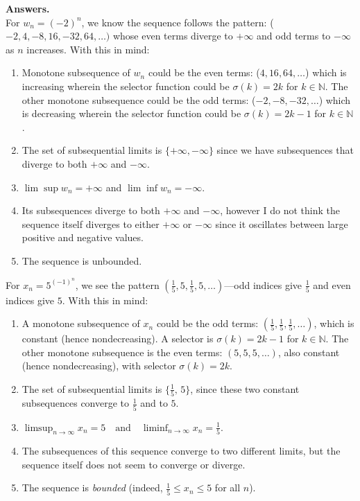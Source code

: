 \documentclass[12pt]{article}
\begin{document}
\textbf{Answers.}\\
For \textbf{$w_n = (-2)^n$}, we know the sequence follows the pattern: ($-2, 4, -8, 16, -32, 64, \dots )$ whose even terms diverge to $+\infty$ and odd terms to $-\infty$ as $n$ increases. With this in mind:
\begin{enumerate}[label=(\alph*)]
    \item Monotone subsequence of $w_n$ could be the even terms: ($4, 16, 64, \dots$) which is increasing wherein the selector function could be $\sigma(k) = 2k$ for $k \in \mathbb{N}$. The other monotone subsequence could be the odd terms: ($-2, -8, -32, \dots$) which is decreasing wherein the selector function could be $\sigma(k) = 2k - 1$ for $k \in \mathbb{N}$.
    \item The set of subsequential limits is $\{ +\infty, -\infty \}$ since we have subsequences that diverge to both $+\infty$ and $-\infty$.
    \item $\lim \sup w_n = +\infty$ and $\lim \inf w_n = -\infty$.
    \item Its subsequences diverge to both $+\infty$ and $-\infty$, however I do not think the sequence itself diverges to either $+\infty$ or $-\infty$ since it oscillates between large positive and negative values.
    \item The sequence is unbounded.
\end{enumerate}

For \textbf{$x_n = 5^{(-1)^n}$}, we see the pattern $(\tfrac{1}{5}, 5, \tfrac{1}{5}, 5, \dots)$—odd indices give $\tfrac{1}{5}$ and even indices give $5$. With this in mind:
\begin{enumerate}[label=(\alph*)]
    \item A monotone subsequence of $x_n$ could be the odd terms: $(\tfrac{1}{5}, \tfrac{1}{5}, \tfrac{1}{5}, \dots)$, which is constant (hence nondecreasing). A selector is $\sigma(k)=2k-1$ for $k\in\mathbb{N}$.  
    The other monotone subsequence is the even terms: $(5, 5, 5, \dots)$, also constant (hence nondecreasing), with selector $\sigma(k)=2k$.
    \item The set of subsequential limits is $\bigl\{\tfrac{1}{5},\,5\bigr\}$, since these two constant subsequences converge to $\tfrac{1}{5}$ and to $5$.
    \item $\limsup_{n\to\infty} x_n = 5 \quad\text{and}\quad \liminf_{n\to\infty} x_n = \tfrac{1}{5}$.
    \item The subsequences of this sequence converge to two different limits, but the sequence itself does not seem to converge or diverge.
    \item The sequence is \emph{bounded} (indeed, $\tfrac{1}{5} \le x_n \le 5$ for all $n$).
\end{enumerate}
\end{document}
